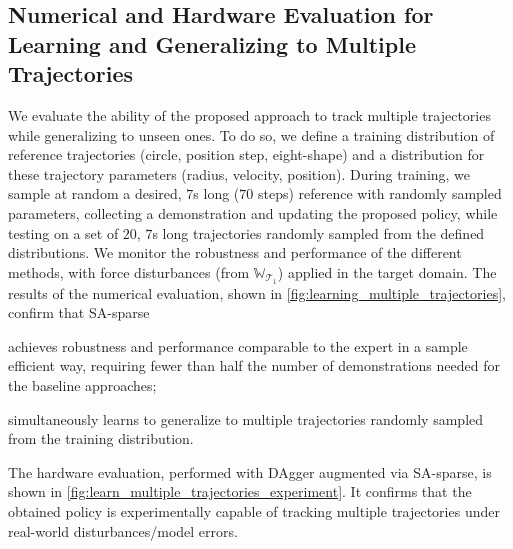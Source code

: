 \subsection{Numerical and Hardware Evaluation for Learning and Generalizing to Multiple Trajectories}
We evaluate the ability of the proposed approach to track multiple trajectories while generalizing to unseen ones. To do so, we define a training distribution of reference trajectories (circle, position step, eight-shape) and a distribution for these trajectory parameters (radius, velocity, position). 
During training, we sample at random a desired, $7$s long ($70$ steps) reference with randomly sampled parameters, collecting a demonstration and updating the proposed policy, while testing on a set of $20$, $7$s long trajectories randomly sampled from the defined distributions. We monitor the robustness and performance of the different methods, with force disturbances (from $\mathbb{W}_{\mathcal{T}_1}$) applied in the target domain. The results of the numerical evaluation, shown in \cref{fig:learning_multiple_trajectories}, confirm that \ac{SA}-sparse
\begin{inparaenum}[i)]
    \item achieves robustness and performance comparable to the expert in a sample efficient way, requiring fewer than half the number of demonstrations needed for the baseline approaches; 
    \item simultaneously learns to generalize to multiple trajectories randomly sampled from the training distribution.
\end{inparaenum}
The hardware evaluation, performed with DAgger augmented via SA-sparse, is shown in \cref{fig:learn_multiple_trajectories_experiment}. It confirms that the obtained policy is experimentally capable of tracking multiple trajectories under real-world disturbances/model errors.